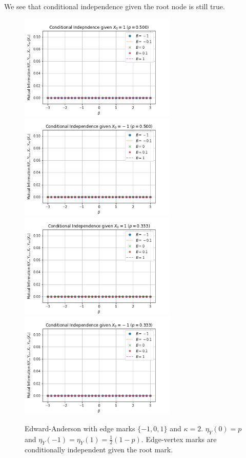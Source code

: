 \documentclass[12pt]{article}
\numberwithin{equation}{section}
\begin{document}
We see that conditional independence given the root node is still true.
\begin{figure}[h]
    \centering
    \includegraphics[width=7.5cm]{img/EA_x1_x2_x0=1_3s_p=0.50_kappa=2.png}
    \includegraphics[width=7.5cm]{img/EA_x1_x2_x0=-1_3s_p=0.50_kappa=2.png}
    \includegraphics[width=7.5cm]{img/EA_x1_x2_x0=1_3s_p=0.33_kappa=2.png}
    \includegraphics[width=7.5cm]{img/EA_x1_x2_x0=-1_3s_p=0.33_kappa=2.png}
    \caption{Edward-Anderson with edge marks $\{-1, 0, 1\}$ and $\kappa=2$. $\eta_Y(0)=p$ and $\eta_Y(-1)=\eta_Y(1)=\frac12(1-p)$. Edge-vertex marks are conditionally independent given the root mark.}
    \label{Fig.EA-CI-k2-3s}
\end{figure}
\end{document}
